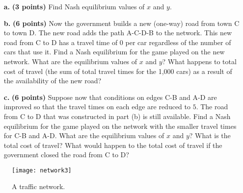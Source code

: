 \documentclass[11pt]{article}
\begin{document}
\begin{itemize}
\item[\textbf{a. }] \textbf{(3 points)} Find Nash equilibrium values of $x$ and $y$.
\item[\textbf{b. }] \textbf{(6 points)} Now the government builds a new (one-way) road from town C to town D.
The new road adds the path A-C-D-B to the network. This new road from
C to D has a travel time of $0$ per car regardless of the number of cars that
use it. Find a Nash equilibrium for the game played on the new network.
What are the equilibrium values of $x$ and $y$? What happens to total cost
of travel (the sum of total travel times for the 1,000 cars) as a result of the
availability of the new road?

\item[\textbf{c. }] \textbf{(6 points)} Suppose now that conditions on edges C-B and A-D are improved so that
the travel times on each edge are reduced to $5$. The road from C to D that
was constructed in part (b) is still available. Find a Nash equilibrium for
the game played on the network with the smaller travel times for C-B and
A-D. What are the equilibrium values of $x$ and $y$? What is the total cost
of travel? What would happen to the total cost of travel if the government
closed the road from C to D?
\end{itemize}

\begin{figure}
\centering
\texttt{[image: network3]}
\caption{A traffic network.}
\label{network3}
\end{figure}
\end{document}
